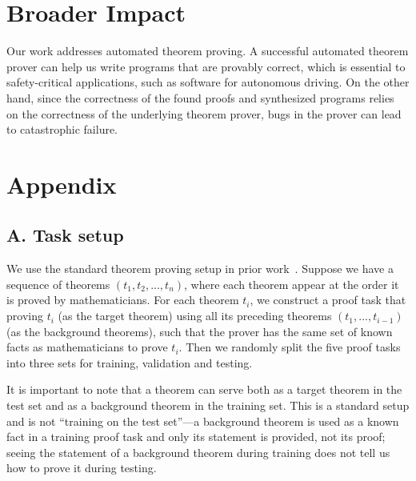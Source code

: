 \documentclass{article}
\begin{document}
\section*{Broader Impact}
Our work addresses automated theorem proving. 
A successful automated theorem prover can help us write programs that are provably correct, which is essential to safety-critical applications, such as software for autonomous driving. On the other hand, since the correctness of the found proofs and synthesized programs relies on the correctness of the underlying theorem prover, bugs in the prover can lead to catastrophic failure. 




\section*{Appendix}

\subsection*{A. Task setup}
We use the standard theorem proving setup in prior work~\cite{irving2016deepmath,bansal2019holist, whalen2016holophrasm}.
Suppose we have a sequence of theorems $(t_1, t_2, ..., t_n)$, where each theorem appear at the order it is proved by mathematicians. For each theorem $t_i$, we construct a proof task
that proving $t_i$ (as the target theorem) using all its preceding theorems $(t_1, ..., t_{i-1})$ (as the background theorems), such that the prover has the same set of known facts as mathematicians to prove $t_i$. Then we randomly split the five proof tasks into three sets for training, validation and testing.

It is important to note that a theorem can serve both as a target theorem in the test set and as a background theorem in the training set. This is a standard setup and is not ``training on the test set''---a background theorem is used as a known fact in a training proof task and only its statement is provided, not its proof; seeing the statement of a background theorem during training does not tell us how to prove it during testing. 
\end{document}
